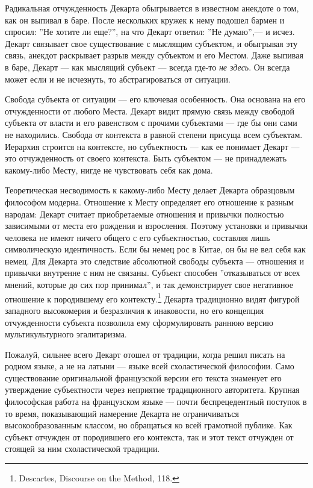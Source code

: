 \documentclass[12pt]{book}
\begin{document}
Радикальная отчужденность Декарта обыгрывается в известном анекдоте о том, как он выпивал в баре. После нескольких кружек к нему подошел бармен и спросил: ''Не хотите ли еще?'', на что Декарт ответил: ''Не думаю'',--- и исчез. Декарт связывает свое существование с мыслящим субъектом, и обыгрывая  эту связь, анекдот раскрывает разрыв между субъектом и его Местом. Даже выпивая в баре, Декарт --- как мыслящий субъект --- всегда где-то \textit{не здесь}. Он всегда может если и не исчезнуть, то абстрагироваться от ситуации.

Свобода субъекта от ситуации --- его ключевая особенность. Она основана на его отчужденности от любого Места. Декарт видит прямую связь между свободой субъекта от власти и его равенством с прочими субъектами --- где бы они сами не находились. Свобода от контекста в равной степени присуща всем субъектам. Иерархия строится на контексте, но субъектность --- как ее понимает Декарт --- это отчужденность от своего контекста. Быть субъектом --- не принадлежать какому-либо Месту, нигде не чувствовать себя как дома.

Теоретическая несводимость к какому-либо Месту делает Декарта образцовым философом модерна. Отношение к Месту определяет его отношение к разным народам: Декарт считает приобретаемые отношения и привычки полностью зависимыми от места его рождения и взросления. Поэтому установки и привычки человека не имеют ничего общего с его субъектностью, составляя лишь символическую идентичность. Если бы немец рос в Китае, он бы не вел себя как немец. Для Декарта это следствие абсолютной свободы субъекта --- отношения и привычки внутренне с ним не связаны. Субъект способен ''отказываться от всех мнений, которые до сих пор принимал'', и так демонстрирует свое негативное отношение к породившему его контексту.\footnote{Descartes, Discourse on the Method, 118.} Декарта традиционно видят фигурой западного высокомерия и безразличия к инаковости, но его концепция отчужденности субъекта позволила ему сформулировать раннюю версию мультикультурного эгалитаризма.

Пожалуй, сильнее всего Декарт отошел от традиции, когда решил писать на родном языке, а не на латыни --- языке всей схоластической философии. Само существование оригинальной французской версии его текста знаменует его утверждение субъектности через неприятие традиционного авторитета. Крупная философская работа на французском языке --- почти беспрецедентный поступок в то время, показывающий намерение Декарта не ограничиваться высокообразованным классом, но обращаться ко всей грамотной публике. Как субъект отчужден от породившего его контекста, так и этот текст отчужден от стоящей за ним схоластической традиции.
\end{document}
